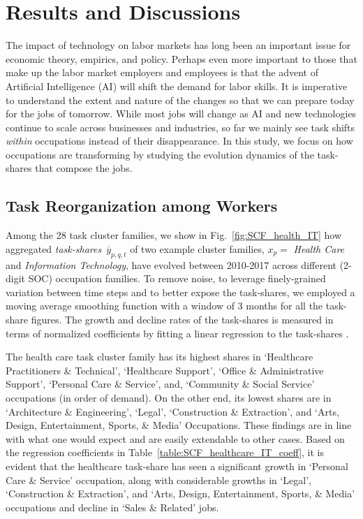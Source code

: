 \documentclass[letterpaper]{article} %
\begin{document}
\section{Results and Discussions}
\label{sec:results}
The impact of technology on labor markets has long been an important issue for economic theory, empirics, and policy. Perhaps even more important to those that make up the labor market employers and employees is that the advent of Artificial Intelligence (AI) will shift the demand for labor skills. It is imperative to understand the extent and nature of the changes so that we can prepare today for the jobs of tomorrow. While most jobs will change as AI and new technologies continue to scale across businesses and industries, so far we mainly see task shifts \textit{within} occupations instead of their disappearance. In this study, we focus on how occupations are transforming by studying the evolution dynamics of the task-shares that compose the jobs.

\subsection{Task Reorganization among Workers}
\label{subsec:res_task_reorg}
Among the 28 task cluster families, we show in Fig.~\ref{fig:SCF_health_IT} how aggregated \emph{task-shares}~$\overline{y}_{p,q,t}$ of two example cluster families, $x_p = $ \emph{Health Care} and \emph{Information Technology}, have evolved between 2010-2017 across different (2-digit SOC) occupation families. To remove noise, to leverage finely-grained variation between time steps and to better expose the task-shares, we employed a moving average smoothing function with a window of 3 months for all the task-share figures. The growth and decline rates of the task-shares is measured in terms of normalized coefficients by fitting a linear regression to the task-shares \cite{bishop2006pattern}.

The health care task cluster family has its highest shares in `Healthcare Practitioners \& Technical', `Healthcare Support', `Office \& Administrative Support', `Personal Care \& Service', and, `Community \& Social Service' occupations (in order of demand). On the other end, its lowest shares are in `Architecture \& Engineering', `Legal', `Construction \& Extraction', and `Arts, Design, Entertainment, Sports, \& Media' Occupations. These findings are in line with what one would expect and are easily extendable to other cases. Based on the regression coefficients in Table~\ref{table:SCF_healthcare_IT_coeff}, it is evident that the healthcare task-share has seen a significant growth in `Personal Care \& Service' occupation, along with considerable growths in `Legal', `Construction \& Extraction', and `Arts, Design, Entertainment, Sports, \& Media' occupations and decline in `Sales \& Related' jobs.
\end{document}
